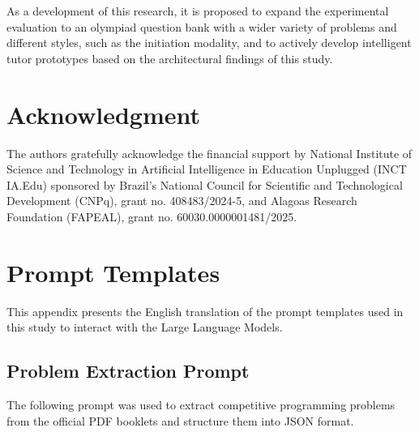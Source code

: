 \documentclass[conference]{IEEEtran}
\begin{document}
As a development of this research, it is proposed to expand the experimental evaluation to an olympiad question bank with a wider variety of problems and different styles, such as the initiation modality, and to actively develop intelligent tutor prototypes based on the architectural findings of this study.

\section*{Acknowledgment}

The authors gratefully acknowledge the financial support by National Institute of Science and Technology in Artificial Intelligence in Education Unplugged (INCT IA.Edu) sponsored by Brazil's National Council for Scientific and Technological Development (CNPq), grant no. 408483/2024-5, and Alagoas Research Foundation (FAPEAL), grant no. 60030.0000001481/2025.

\appendices

\section{Prompt Templates}
\label{apx:prompts}

This appendix presents the English translation of the prompt templates used in this study to interact with the Large Language Models.

\subsection{Problem Extraction Prompt}
The following prompt was used to extract competitive programming problems from the official PDF booklets and structure them into JSON format.
\end{document}
